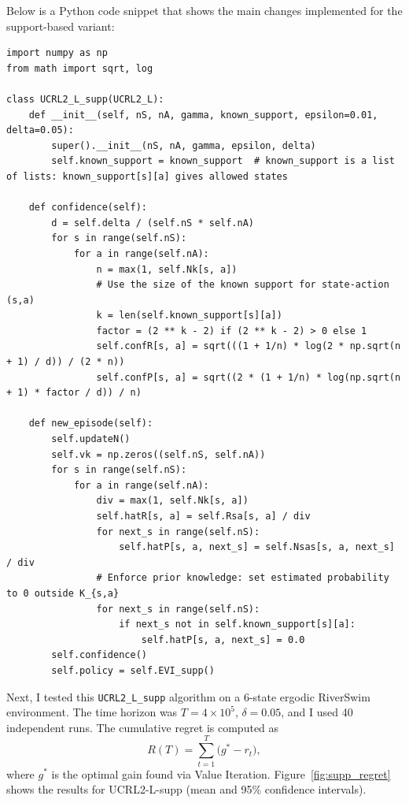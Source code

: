 Below is a Python code snippet that shows the main changes implemented for the support-based variant:

\begin{lstlisting}
import numpy as np
from math import sqrt, log

class UCRL2_L_supp(UCRL2_L):
    def __init__(self, nS, nA, gamma, known_support, epsilon=0.01, delta=0.05):
        super().__init__(nS, nA, gamma, epsilon, delta)
        self.known_support = known_support  # known_support is a list of lists: known_support[s][a] gives allowed states

    def confidence(self):
        d = self.delta / (self.nS * self.nA)
        for s in range(self.nS):
            for a in range(self.nA):
                n = max(1, self.Nk[s, a])
                # Use the size of the known support for state-action (s,a)
                k = len(self.known_support[s][a])
                factor = (2 ** k - 2) if (2 ** k - 2) > 0 else 1
                self.confR[s, a] = sqrt(((1 + 1/n) * log(2 * np.sqrt(n + 1) / d)) / (2 * n))
                self.confP[s, a] = sqrt((2 * (1 + 1/n) * log(np.sqrt(n + 1) * factor / d)) / n)

    def new_episode(self):
        self.updateN()
        self.vk = np.zeros((self.nS, self.nA))
        for s in range(self.nS):
            for a in range(self.nA):
                div = max(1, self.Nk[s, a])
                self.hatR[s, a] = self.Rsa[s, a] / div
                for next_s in range(self.nS):
                    self.hatP[s, a, next_s] = self.Nsas[s, a, next_s] / div
                # Enforce prior knowledge: set estimated probability to 0 outside K_{s,a}
                for next_s in range(self.nS):
                    if next_s not in self.known_support[s][a]:
                        self.hatP[s, a, next_s] = 0.0
        self.confidence()
        self.policy = self.EVI_supp()
\end{lstlisting}

Next, I tested this \texttt{UCRL2\_L\_supp} algorithm on a 6-state ergodic RiverSwim environment. The time horizon was $T = 4 \times 10^5$, $\delta = 0.05$, and I used 40 independent runs. The cumulative regret is computed as
\[
R(T) = \sum_{t=1}^{T} \bigl(g^* - r_t\bigr),
\]
where $g^*$ is the optimal gain found via Value Iteration. Figure~\ref{fig:supp_regret} shows the results for UCRL2-L-supp (mean and 95\% confidence intervals).

